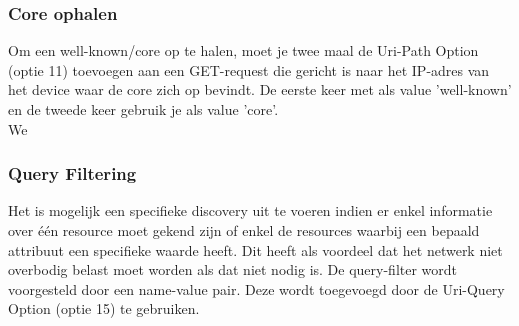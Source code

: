 \subsubsection{Core ophalen}
Om een well-known/core op te halen, moet je twee maal de Uri-Path Option (optie 11) toevoegen aan een GET-request die gericht is naar het IP-adres van het device waar de core zich op bevindt. De eerste keer met als value 'well-known' en de tweede keer gebruik je als value 'core'.\\

We 

\subsubsection{Query Filtering}
Het is mogelijk een specifieke discovery uit te voeren indien er enkel informatie over één resource moet gekend zijn of enkel de resources waarbij een bepaald attribuut een specifieke waarde heeft. Dit heeft als voordeel dat het netwerk niet overbodig belast moet worden als dat niet nodig is. De query-filter wordt voorgesteld door een name-value pair. Deze wordt toegevoegd door de Uri-Query Option (optie 15) te gebruiken.

